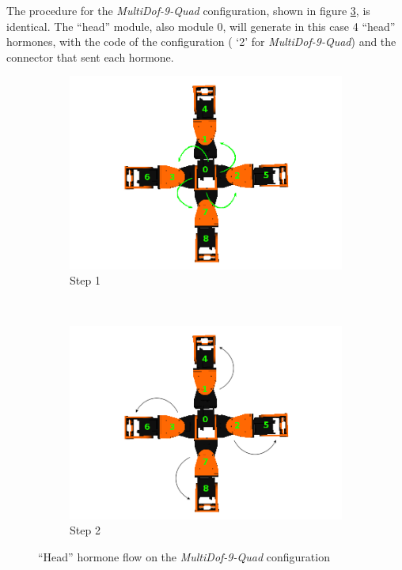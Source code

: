 The procedure for the \emph{MultiDof-9-Quad} configuration, shown in figure \ref{fig:global_conf_discovery_quad_head}, is identical. The ``head'' module, also module 0, will generate in this case 4 ``head'' hormones, with the code of the configuration ( `2' for \emph{MultiDof-9-Quad}) and the connector that sent each hormone.\\
\begin{figure}[h]
		\centering
        \begin{subfigure}[l]{0.45\textwidth}
                \centering
                \includegraphics[width=\textwidth]{images/Hormone_protocol_quad_head_step1.png}
                \caption{Step 1}
                \label{fig:quad_step1_head}
        \end{subfigure}
        ~
        \begin{subfigure}[r]{0.45\textwidth}
                \centering
                \includegraphics[width=\textwidth]{images/Hormone_protocol_quad_head_step2.png}
                \caption{Step 2}
                \label{fig:quad_step2_head}
        \end{subfigure}
        \caption{``Head'' hormone flow on the \emph{MultiDof-9-Quad} configuration}\label{fig:global_conf_discovery_quad_head}
\end{figure}

